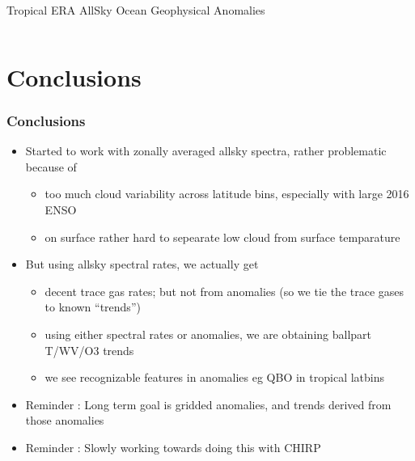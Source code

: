 \documentclass[10pt,t]{beamer}
\begin{document}
\begin{frame}{Tropical ERA AllSky Ocean Geophysical Anomalies}
\begin{columns}
\begin{column}{0.45\columnwidth}

\end{column}
\end{columns}
\end{frame}



\section{Conclusions}
\begin{frame}
  \frametitle{Conclusions}
  \begin{itemize}
  \item Started to work with zonally averaged allsky spectra, rather problematic because of
  \begin{itemize}
    \item too much cloud variability across latitude bins, especially with large 2016 ENSO
    \item on surface rather hard to sepearate low cloud from surface temparature
  \end{itemize}
  \item But using allsky spectral rates, we actually get 
  \begin{itemize}
    \item  decent trace gas rates; but not from anomalies (so we tie the trace gases to known ``trends'')
    \item using either spectral rates or anomalies, we are obtaining ballpart T/WV/O3 trends
    \item we see recognizable features in anomalies eg QBO in tropical latbins
  \end{itemize}
  \item Reminder : Long term goal is gridded anomalies, and trends derived from those anomalies
  \item Reminder : Slowly working towards doing this with CHIRP

  \end{itemize}
\end{frame}
\end{document}
